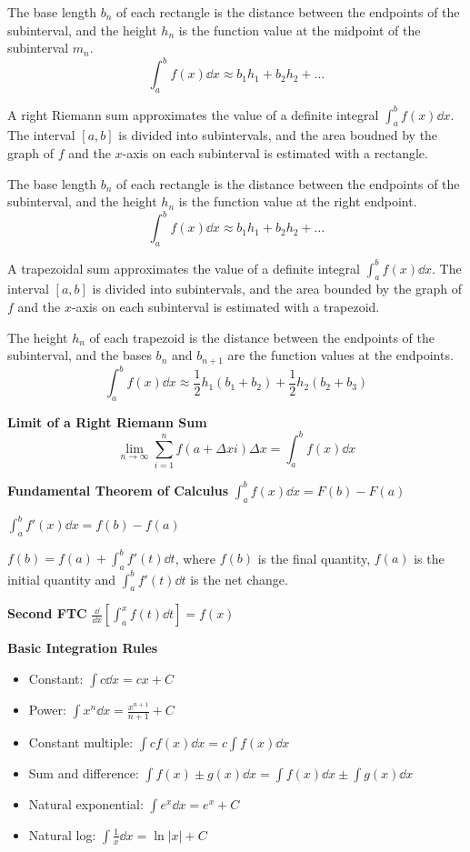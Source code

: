\documentclass[10pt,a4paper,oneside]{book}
\begin{document}
The base length $b_n$ of each rectangle is the distance between the endpoints of the subinterval, and the height $h_n$ is the function value at the midpoint of the subinterval $m_n$.
\[ \int_a^b f(x)\dd x \approx b_1h_1+b_2h_2+\dots \]

A right Riemann sum approximates the value of a definite integral $\int_a^b f(x)\dd x$. The interval $[a,b]$ is divided 
into subintervals, and the area boudned by the graph of $f$ and the $x$-axis on each subinterval is estimated with a rectangle.

The base length $b_n$ of each rectangle is the distance between the endpoints of the subinterval, and the height $h_n$ is the function value at the right endpoint.
\[ \int_a^b f(x)\dd x \approx b_1h_1+b_2h_2+\dots \]

A trapezoidal sum approximates the value of a definite integral $\int_a^b f(x)\dd x$. The interval $[a,b]$ is divided into subintervals, and the area bounded by the graph of $f$ and the $x$-axis on each subinterval is estimated with a trapezoid.

The height $h_n$ of each trapezoid is the distance between the endpoints of the subinterval, and the bases $b_n$ and $b_{n+1}$ are the function values at the endpoints.
\[ \int_a^b f(x)\dd x\approx \frac{1}{2}h_1(b_1+b_2)+\frac{1}{2}h_2(b_2+b_3) \]

\textbf{Limit of a Right Riemann Sum}
\[ \lim_{n\to \infty}\sum^n_{i=1}f(a+\Delta xi)\Delta x = \int_a^b f(x)\dd x\]

\textbf{Fundamental Theorem of Calculus}
$\int_a^b f(x) \dd x = F(b)-F(a)$

$\int_a^b f'(x) \dd x = f(b)-f(a)$

$f(b)=f(a)+\int_a^b f'(t)\dd t$, where $f(b)$ is the final quantity, $f(a)$ is the initial quantity and $\int_a^b f'(t)\dd t$ is the net change.

\textbf{Second FTC}
$\frac{\dd}{\dd x}[\int_a^x f(t)\dd t] = f(x)$

\textbf{Basic Integration Rules}
\begin{itemize}
    \item Constant: $\int c\dd x = cx+C$
    \item Power: $\int x^n \dd x = \frac{x^{n+1}}{n+1}+C$
    \item Constant multiple: $\int cf(x)\dd x = c\int f(x)\dd x$
    \item Sum and difference: $\int f(x)\pm g(x)\dd x = \int f(x)\dd x\pm \int g(x)\dd x$
    \item Natural exponential: $\int e^x \dd x = e^x + C$
    \item Natural log: $\int \frac{1}{x}\dd x = \ln|x|+C$
\end{itemize}
\end{document}
